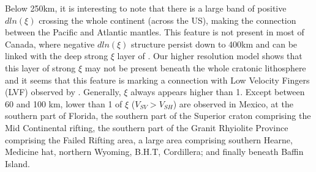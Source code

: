 \documentclass[12pt]{article}
\begin{document}
		Below 250km, it is interesting to note that there is a large band of positive $dln(\xi)$ crossing the whole continent (across the US), making the connection between the Pacific and Atlantic mantles. 
		This feature is not present in most of Canada, where negative $dln(\xi)$ structure persist down to 400km and can be linked with the deep strong $\xi$ layer of \cite{gung2003global}. Our higher resolution model shows that this layer of strong $\xi$ may not be present beneath the whole cratonic lithosphere and it seems that this feature is marking a connection with Low Velocity Fingers (LVF) observed by \cite{french2013waveform}. %
		Generally, $\xi$ always appears higher than 1. 
		Except between 60 and 100 km, lower than 1 of $\xi$ ($V_{SV} > V_{SH}$) are observed in Mexico, at the southern part of Florida, the southern part of the Superior craton comprising the Mid Continental rifting, the southern part of the Granit Rhyiolite Province comprising the Failed Rifting area, a large area comprising southern Hearne, Medicine hat, northern Wyoming, B.H.T, Cordillera; and finally beneath Baffin Island. 
\end{document}
